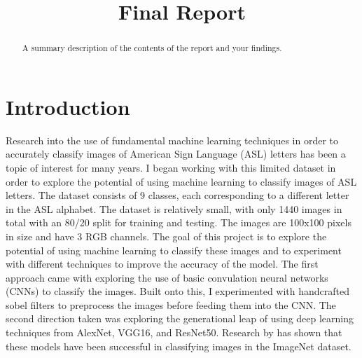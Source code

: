 \documentclass[conference]{IEEEtran}
\begin{document}
\title{Final Report\\}

\author{
}

\maketitle

\begin{abstract}
A summary description of the contents of the report and your findings.
\end{abstract}

\section{Introduction}

Research into the use of fundamental machine learning techniques in order to accurately classify images of American Sign Language (ASL) letters has been a topic of interest for many years. I began working with this limited dataset in order to explore the potential of using machine learning to classify images of ASL letters. The dataset consists of 9 classes, each corresponding to a different letter in the ASL alphabet. The dataset is relatively small, with only 1440 images in total with an 80/20 split for training and testing. The images are 100x100 pixels in size and have 3 RGB channels. The goal of this project is to explore the potential of using machine learning to classify these images and to experiment with different techniques to improve the accuracy of the model. The first approach came with exploring the use of basic convulation neural networks (CNNs) to classify the images. Built onto this, I experimented with handcrafted sobel filters to preprocess the images before feeding them into the CNN. The second direction taken was exploring the generational leap of using deep learning techniques from AlexNet, VGG16, and ResNet50. Research by has shown that these models have been successful in classifying images in the ImageNet dataset. \cite{DBLP:journals/corr/HuangLW16a}
\end{document}
